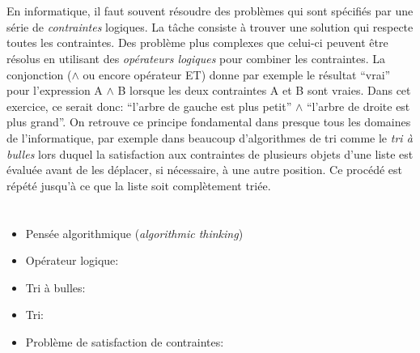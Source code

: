 {{{\centering%
\par}



\section*{\BrochureItsInformatics}
En informatique, il faut souvent résoudre des problèmes qui sont spécifiés par une série de \emph{contraintes} logiques. La tâche consiste à trouver une solution qui respecte toutes les contraintes. Des problème plus complexes que celui-ci peuvent être résolus en utilisant des \emph{opérateurs logiques} pour combiner les contraintes. La conjonction (${\wedge}$ ou encore opérateur ET) donne par exemple le résultat “vrai” pour l’expression A ${\wedge}$ B lorsque les deux contraintes A et B sont vraies. Dans cet exercice, ce serait donc: “l’arbre de gauche est plus petit” ${\wedge}$ “l’arbre de droite est plus grand”. On retrouve ce principe fondamental dans presque tous les domaines de l’informatique, par exemple dans beaucoup d’algorithmes de tri comme le \emph{tri à bulles} lors duquel la satisfaction aux contraintes de plusieurs objets d’une liste est évaluée avant de les déplacer, si nécessaire, à une autre position. Ce procédé est répété jusqu’à ce que la liste soit complètement triée.



\section*{\BrochureWebsitesAndKeywords}
{\raggedright
\begin{itemize}
  \item Pensée algorithmique (\emph{algorithmic thinking})
  \item Opérateur logique: \href{https://fr.wikipedia.org/wiki/Connecteur_logique}{}
  \item Tri à bulles: \href{https://fr.wikipedia.org/wiki/Tri_\%C3\%A0_bulles}{}
  \item Tri: \href{https://sorting.at/}{}
  \item Problème de satisfaction de contraintes: \href{https://fr.wikipedia.org/wiki/Probl\%C3\%A8me_de_satisfaction_de_contraintes}{}
\end{itemize}


}}}

